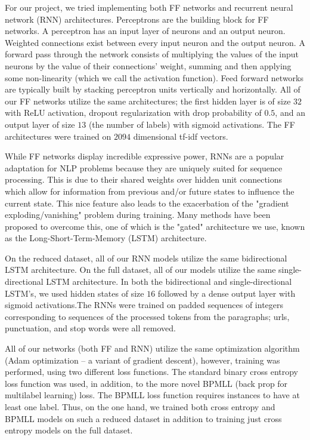 \documentclass[11pt]{article}
\begin{document}
For our project, we tried implementing both FF networks and recurrent neural network (RNN) architectures. Perceptrons are the building block for FF networks. A perceptron has an input layer of neurons and an output neuron. Weighted connections exist between every input neuron and the output neuron. A forward pass through the network consists of multiplying the values of the input neurons by the value of their connections' weight, summing and then applying some non-linearity (which we call the activation function). Feed forward networks are typically built by stacking perceptron units vertically and horizontally. All of our FF networks utilize the same architectures; the first hidden layer is of size $32$ with ReLU activation, dropout regularization with drop probability of $0.5$, and an output layer of size $13$ (the number of labels) with sigmoid activations. The FF architectures were trained on $2094$ dimensional tf-idf vectors. 

While FF networks display incredible expressive power, RNNs are a popular adaptation for NLP problems because they are uniquely suited for sequence processing. This is due to their shared weights over hidden unit connections which allow for information from previous and/or future states to influence the current state. This nice feature also leads to the exacerbation of the "gradient exploding/vanishing" problem during training. Many methods have been proposed to overcome this, one of which is the "gated" architecture we use, known as the Long-Short-Term-Memory (LSTM) architecture. 

On the reduced dataset, all of our RNN models utilize the same bidirectional LSTM architecture. On the full dataset, all of our models utilize the same single-directional LSTM architecture. In both the bidirectional and single-directional LSTM's, we used hidden states of size $16$ followed by a dense output layer with sigmoid activations.The RNNs were trained on padded sequences of integers corresponding to sequences of the processed tokens from the paragraphs; urls, punctuation, and stop words were all removed. 

All of our networks (both FF and RNN) utilize the same optimization algorithm (Adam optimization -- a variant of gradient descent), however, training was performed, using two different loss functions. The standard binary cross entropy loss function was used, in addition, to the more novel BPMLL (back prop for multilabel learning) loss. The BPMLL loss function requires instances to have at least one label. Thus, on the one hand, we trained both cross entropy and BPMLL models on such a reduced dataset in addition to training just cross entropy models on the full dataset. 
\end{document}
